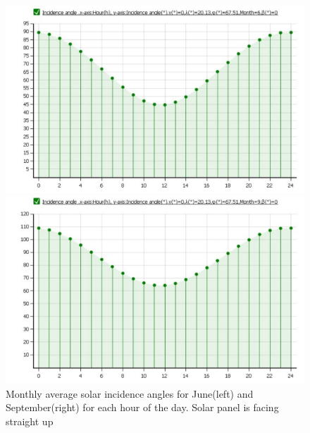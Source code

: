 \begin{figure}[H]
\centering
\begin{minipage}[t]{0.48\linewidth}
\includegraphics[width=\textwidth]{figures/fig_CDR_EPS_SolarIncidenceAngle_Jun}
\end{minipage}
\begin{minipage}[t]{0.48\linewidth}
\centering
\includegraphics[width=\textwidth]{figures/fig_CDR_EPS_SolarIncidenceAngle_Sep}
\end{minipage}
\caption[Solar Incidence Angles]{Monthly average solar incidence angles for June(left) and September(right) for each hour of the day. Solar panel is facing straight up}
\label{fig:SolarIncidenceAngles}
\end{figure}
%
